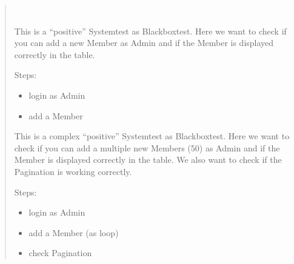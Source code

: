 \documentclass[letterpaper,10pt,english]{sphinxmanual}
\begin{document}
\label{\detokenize{masterCodeDoc:testcase-004}}\begin{quote}


\begin{fulllineitems}
~

\begin{fulllineitems}
This is a “positive” Systemtest as Blackboxtest.
Here we want to check if you can add a new Member as Admin and if the
Member is displayed correctly in the table.

Steps:
\begin{itemize}
\item {} 
login as Admin

\item {} 
add a Member

\end{itemize}

\end{fulllineitems}



\begin{fulllineitems}
This is a complex “positive” Systemtest as Blackboxtest.
Here we want to check if you can add a multiple new Members (50) as Admin and if the
Member is displayed correctly in the table.
We also want to check if the Pagination is working correctly.

Steps:
\begin{itemize}
\item {} 
login as Admin

\item {} 
add a Member (as loop)

\item {} 
check Pagination

\end{itemize}

\end{fulllineitems}


\end{fulllineitems}

\end{quote}
\end{document}
